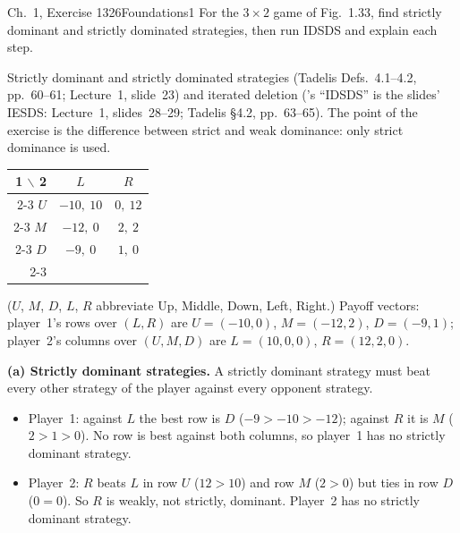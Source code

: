 \begin{exsol}{\MG{} Ch.~1, Exercise 13}{26}{Foundations}{1}
\asked For the $3\times2$ game of Fig.~1.33, find strictly dominant and strictly dominated
strategies, then run IDSDS and explain each step.

\method Strictly dominant and strictly dominated strategies (Tadelis Defs.~4.1--4.2, pp.~60--61;
Lecture~1, slide~23) and iterated deletion (\MG{}'s ``IDSDS'' is the slides' IESDS: Lecture~1,
slides~28--29; Tadelis \S4.2, pp.~63--65). The point of the exercise is the difference between
strict and weak dominance: only strict dominance is used.

\solution
\begin{center}
\begin{tabular}{r|c|c|}
\multicolumn{1}{r}{1 $\backslash$ 2} & \multicolumn{1}{c}{$L$} & \multicolumn{1}{c}{$R$}\\ \cline{2-3}
$U$ & $-10,\ 10$ & $0,\ 12$ \\ \cline{2-3}
$M$ & $-12,\ 0$ & $2,\ 2$ \\ \cline{2-3}
$D$ & $-9,\ 0$ & $1,\ 0$ \\ \cline{2-3}
\end{tabular}
\end{center}
($U$, $M$, $D$, $L$, $R$ abbreviate Up, Middle, Down, Left, Right.) Payoff vectors: player~1's rows
over $(L, R)$ are $U = (-10, 0)$, $M = (-12, 2)$, $D = (-9, 1)$; player~2's columns over
$(U, M, D)$ are $L = (10, 0, 0)$, $R = (12, 2, 0)$.

\textbf{(a) Strictly dominant strategies.} A strictly dominant strategy must beat every other
strategy of the player against every opponent strategy.
\begin{itemize}
  \item Player~1: against $L$ the best row is $D$ ($-9 > -10 > -12$); against $R$ it is $M$
  ($2 > 1 > 0$). No row is best against both columns, so player~1 has no strictly dominant
  strategy.
  \item Player~2: $R$ beats $L$ in row $U$ ($12 > 10$) and row $M$ ($2 > 0$) but ties in row $D$
  ($0 = 0$). So $R$ is weakly, not strictly, dominant. Player~2 has no strictly dominant
  strategy.
\end{itemize}


\end{exsol}
